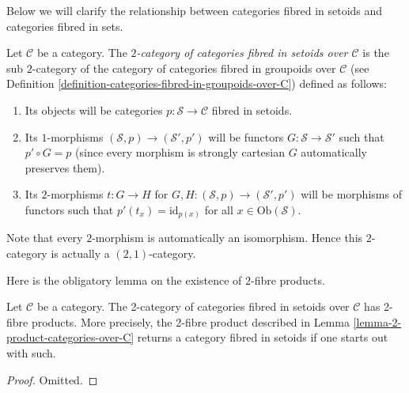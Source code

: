 \noindent
Below we will clarify the relationship between categories fibred in setoids
and categories fibred in sets.

\begin{definition}
\label{definition-categories-fibred-in-setoids-over-C}
Let $\mathcal{C}$ be a category.
The {\it $2$-category of categories fibred in setoids over $\mathcal{C}$}
is the sub $2$-category of the category of categories fibred in groupoids
over $\mathcal{C}$ (see
Definition \ref{definition-categories-fibred-in-groupoids-over-C})
defined as follows:
\begin{enumerate}
\item Its objects will be categories
$p : \mathcal{S} \to \mathcal{C}$ fibred in setoids.
\item Its $1$-morphisms $(\mathcal{S}, p) \to (\mathcal{S}', p')$
will be functors $G : \mathcal{S} \to \mathcal{S}'$ such that
$p' \circ G = p$ (since every morphism is strongly cartesian
$G$ automatically preserves them).
\item Its $2$-morphisms $t : G \to H$ for
$G, H : (\mathcal{S}, p) \to (\mathcal{S}', p')$
will be morphisms of functors
such that $p'(t_x) = \text{id}_{p(x)}$
for all $x \in \text{Ob}(\mathcal{S})$.
\end{enumerate}
\end{definition}

\noindent
Note that every $2$-morphism is automatically an isomorphism.
Hence this $2$-category is actually a $(2, 1)$-category.

\noindent
Here is the obligatory lemma on the existence of $2$-fibre products.

\begin{lemma}
\label{lemma-2-product-categories-fibred-setoids}
Let $\mathcal{C}$ be a category.
The 2-category of categories fibred in setoids over $\mathcal{C}$
has 2-fibre products. More precisely, the 2-fibre product described in
Lemma \ref{lemma-2-product-categories-over-C} returns a category fibred in
setoids if one starts out with such.
\end{lemma}

\begin{proof}
Omitted.
\end{proof}

